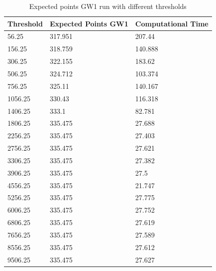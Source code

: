 \begin{table}[]
\centering
\begin{tabular}{@{}lll@{}}
\toprule
Threshold & Expected Points GW1 & Computational Time \\ \midrule
56.25     & 317.951             & 207.44             \\
156.25    & 318.759             & 140.888            \\
306.25    & 322.155             & 183.62             \\
506.25    & 324.712             & 103.374            \\
756.25    & 325.11              & 140.167            \\
1056.25   & 330.43              & 116.318            \\
1406.25   & 333.1               & 82.781             \\
1806.25   & 335.475             & 27.688             \\
2256.25   & 335.475             & 27.403             \\
2756.25   & 335.475             & 27.621             \\
3306.25   & 335.475             & 27.382             \\
3906.25   & 335.475             & 27.5               \\
4556.25   & 335.475             & 21.747             \\
5256.25   & 335.475             & 27.775             \\
6006.25   & 335.475             & 27.752             \\
6806.25   & 335.475             & 27.619             \\
7656.25   & 335.475             & 27.589             \\
8556.25   & 335.475             & 27.612             \\
9506.25   & 335.475             & 27.627             \\ \bottomrule
\end{tabular}
\caption{Expected points GW1 run with different thresholds}
\label{tab: threshold_expected_points_gw1_halves}
\end{table}



